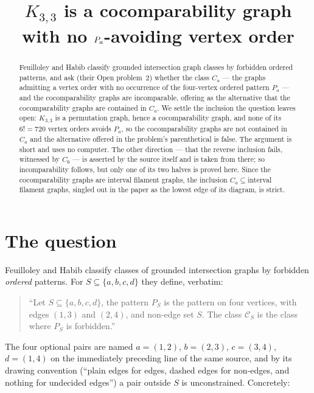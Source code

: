 \documentclass[11pt]{amsart}
\title[$K_{3,3}$ and the ordered pattern class $C_a$]
{$K_{3,3}$ is a cocomparability graph\\ with no $\Pa$-avoiding vertex order}
\date{}
\theoremstyle{remark}
\newcommand{\Ca}{C_a}
\newcommand{\Pa}{P_a}
\begin{document}
\begin{abstract}
Feuilloley and Habib classify grounded intersection graph classes by forbidden
ordered patterns, and ask (their Open problem~2) whether the class $\Ca$ --- the
graphs admitting a vertex order with no occurrence of the four-vertex ordered
pattern $\Pa$ --- and the cocomparability graphs are incomparable, offering as the
alternative that the cocomparability graphs are contained in $\Ca$. We settle the
inclusion the question leaves open: $K_{3,3}$ is a permutation graph, hence a
cocomparability graph, and none of its $6!=720$ vertex orders avoids $\Pa$, so the
cocomparability graphs are not contained in $\Ca$ and the alternative offered in the
problem's parenthetical is false. The argument is short and uses no computer. The
other direction --- that the reverse inclusion fails, witnessed by $C_6$ --- is
asserted by the source itself and is taken from there; so incomparability follows,
but only one of its two halves is proved here. Since the cocomparability
graphs are interval filament graphs, the inclusion $\Ca\subseteq{}$interval
filament graphs, singled out in the paper as the lowest edge of its diagram, is
strict.
\end{abstract}

\maketitle

\section{The question}

Feuilloley and Habib \cite{FH} classify classes of grounded intersection graphs by
forbidden \emph{ordered} patterns. For $S\subseteq\{a,b,c,d\}$ they define,
verbatim:

\begin{quote}
``Let $S \subseteq \{a,b,c,d\}$, the pattern $P_{S}$ is the pattern on four
vertices, with edges $(1,3)$ and $(2,4)$, and non-edge set $S$. The class
$\mathcal C_{S}$ is the class where $P_{S}$ is forbidden.''
\end{quote}

The four optional pairs are named $a=(1,2)$, $b=(2,3)$, $c=(3,4)$, $d=(1,4)$ on
the immediately preceding line of the same source, and by its drawing convention
(``plain edges for edges, dashed edges for non-edges, and nothing for undecided
edges'') a pair outside $S$ is unconstrained. Concretely:
\end{document}
